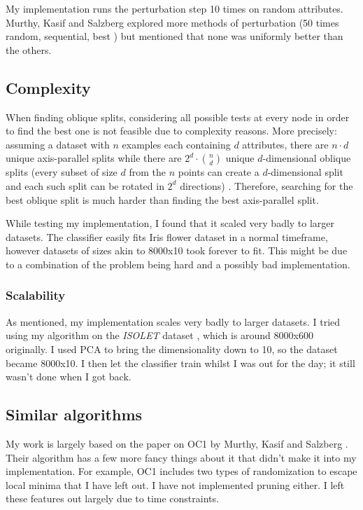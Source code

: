 \documentclass[12pt]{article}
\begin{document}
My implementation runs the perturbation step 10 times on random attributes. Murthy, Kasif and Salzberg explored more methods of perturbation (50 times random, sequential, best \cite{KSM:1994}) but mentioned that none was uniformly better than the others.

\subsection{Complexity}
When finding oblique splits, considering all possible tests at every node in order to find the best one is not feasible due to complexity reasons. More precisely: assuming a dataset with $n$ examples each containing $d$ attributes, there are $n \cdot d$ unique axis-parallel splits while there are $2^d \cdot {n \choose d}$ unique $d$-dimensional oblique splits (every subset of size $d$ from the $n$ points can create a $d$-dimensional split and each such split can be rotated in $2^d$ directions) \cite{KSM:1994}. Therefore, searching for the best oblique split is much harder than finding the best axis-parallel split.

While testing my implementation, I found that it scaled very badly to larger datasets. The classifier easily fits Iris flower dataset in a normal timeframe, however datasets of sizes akin to 8000x10 took forever to fit. This might be due to a combination of the problem being hard and a possibly bad implementation.

\subsubsection{Scalability}
As mentioned, my implementation scales very badly to larger datasets. I tried using my algorithm on the \emph{ISOLET} dataset \cite{Bache+Lichman:2013}, which is around 8000x600 originally. I used PCA to bring the dimensionality down to 10, so the dataset became 8000x10. I then let the classifier train whilst I was out for the day; it still wasn't done when I got back.

\subsection{Similar algorithms}
My work is largely based on the paper on OC1 by Murthy, Kasif and Salzberg \cite{KSM:1994}. Their algorithm has a few more fancy things about it that didn't make it into my implementation. For example, OC1 includes two types of randomization to escape local minima that I have left out. I have not implemented pruning either. I left these features out largely due to time constraints.
\end{document}
